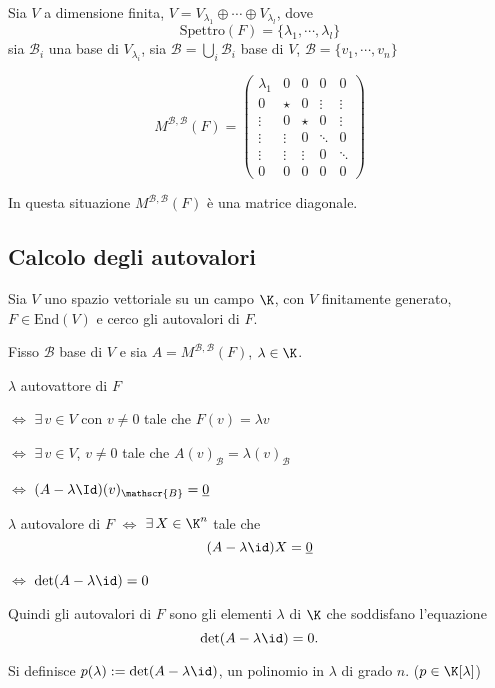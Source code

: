 
Sia $ V $ a dimensione finita, $ V=V_{\lambda_1}\oplus\cdots\oplus V_{\lambda_{l} }   $, dove \[\text{Spettro}(F)=\{\lambda_1, \cdots, \lambda_{l} \}\] sia $ \mathscr{B}_i$ una base di $ V_{\lambda_{i} }  $, sia $ \mathscr{B}=\bigcup_{i} \mathscr{B}_i  $ base di $ V $, $ \mathscr{B}=\{v_1, \cdots, v_{n} \} $

\[
    M^{ \mathscr{B}, \mathscr{B}}(F)=\begin{pmatrix}
        \lambda_1 & 0 & 0 & 0 & 0\\
        0 & \star & 0 & \vdots & \vdots\\
        \vdots & 0 & \star & 0 & \vdots\\
        \vdots & \vdots & 0 & \ddots & 0\\
        \vdots & \vdots & \vdots & 0 & \ddots\\
        0 & 0 & 0 & 0 & 0
    \end{pmatrix}
\]

In questa situazione $ M^{ \mathscr{B}, \mathscr{B}}(F) $ è una matrice diagonale.

\subsection{Calcolo degli autovalori}

Sia $ V $ uno spazio vettoriale su un campo $ \K $, con $ V $ finitamente generato, $ F \in \text{End}(V) $ e cerco gli autovalori di $ F $.

Fisso $ \mathscr{B} $ base di $ V  $ e sia $ A = M^{ \mathscr{B}, \mathscr{B}}(F)$, $\lambda \in \K$. 

$\lambda$ autovattore di $ F $ 

$ \iff $ $ \exists\, v \in V $ con $ v \neq 0 $ tale che $ F(v)=\lambda v $ 

$ \iff $ $ \exists\, v \in V $, $ v \neq 0 $ tale che $ A(v)_{ \mathscr{B}}= \lambda (v)_{ \mathscr{B}} $

$ \iff $ $ (A- \lambda \Id)(v)_{ \mathscr{B}}=\underline{0} $

$ \lambda $ autovalore di $ F $ $ \iff $ $ \exists\,X \in \K^{n} $ tale che \[
    (A-\lambda\id)X=\underline{0}
\]

$ \iff $ $ \det(A-\lambda\id)=0 $

Quindi gli autovalori di $ F $ sono gli elementi $\lambda$ di $ \K  $ che soddisfano l'equazione \[
    \det(A-\lambda\id)=0.
\]

Si definisce $ p(\lambda):=\det(A-\lambda\id) $, un polinomio in $ \lambda $ di grado $ n $. ($p \in \K[\lambda]$)


